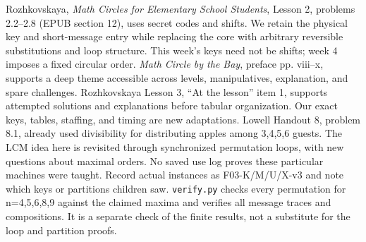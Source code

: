 \documentclass[12pt]{extarticle}
\begin{document}
Rozhkovskaya, \emph{Math Circles for Elementary School Students}, Lesson 2, problems 2.2--2.8 (EPUB section 12), uses secret codes and shifts. We retain the physical key and short-message entry while replacing the core with arbitrary reversible substitutions and loop structure. This week's keys need not be shifts; week 4 imposes a fixed circular order.
\emph{Math Circle by the Bay}, preface pp. viii--x, supports a deep theme accessible across levels, manipulatives, explanation, and spare challenges. Rozhkovskaya Lesson 3, ``At the lesson'' item 1, supports attempted solutions and explanations before tabular organization. Our exact keys, tables, staffing, and timing are new adaptations.
Lowell Handout 8, problem 8.1, already used divisibility for distributing apples among 3,4,5,6 guests. The LCM idea here is revisited through synchronized permutation loops, with new questions about maximal orders. No saved use log proves these particular machines were taught. Record actual instances as F03-K/M/U/X-v3 and note which keys or partitions children saw.
\texttt{verify.py} checks every permutation for n=4,5,6,8,9 against the claimed maxima and verifies all message traces and compositions. It is a separate check of the finite results, not a substitute for the loop and partition proofs.
\end{document}
